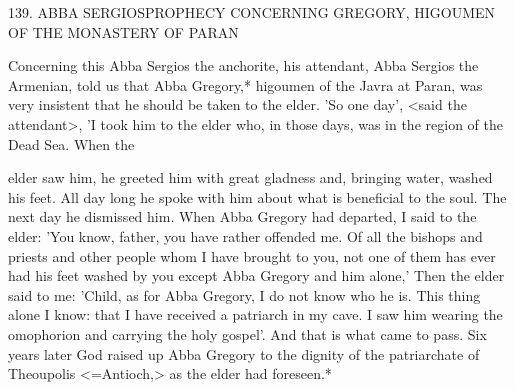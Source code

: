 139. ABBA SERGIOS\textquotesingle  PROPHECY
CONCERNING GREGORY,
HIGOUMEN OF THE MONASTERY OF PARAN

Concerning this Abba Sergios the anchorite, his attendant, Abba
Sergios the Armenian, told us that Abba Gregory,* higoumen of the
Javra at Paran, was very insistent that he should be taken to the
elder. 'So one day', <said the attendant>, 'I took him to the elder
who, in those days, was in the region of the Dead Sea. When the

elder saw him, he greeted him with great gladness and, bringing
water, washed his feet. All day long he spoke with him about what
is beneficial to the soul. The next day he dismissed him. When Abba
Gregory had departed, I said to the elder: 'You know, father, you
have rather offended me. Of all the bishops and priests and other
people whom I have brought to you, not one of them has ever had
his feet washed by you except Abba Gregory and him alone,' Then
the elder said to me: 'Child, as for Abba Gregory, I do not know
who he is. This thing alone I know: that I have received a patriarch
in my cave. I saw him wearing the omophorion and carrying the
holy gospel'. And that is what came to pass. Six years later God
raised up Abba Gregory to the dignity of the patriarchate of
Theoupolis <=Antioch,> as the elder had foreseen.*

